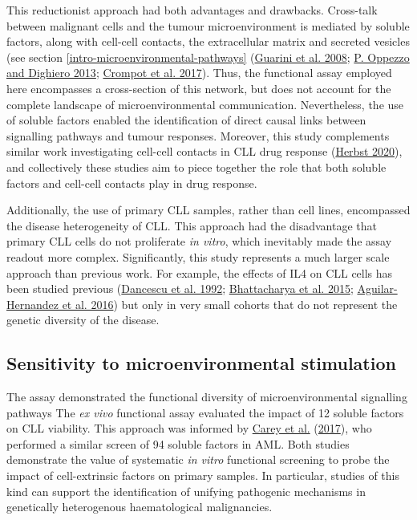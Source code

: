 \documentclass[11pt, a4paper, twosided]{book}
\begin{document}
This reductionist approach had both advantages and drawbacks. Cross-talk between malignant cells and the tumour microenvironment is mediated by soluble factors, along with cell-cell contacts, the extracellular matrix and secreted vesicles (see section \ref{intro-microenvironmental-pathways} (\protect\hyperlink{ref-Guarini2008}{Guarini et al. 2008}; \protect\hyperlink{ref-Oppezzo2013}{P. Oppezzo and Dighiero 2013}; \protect\hyperlink{ref-Crompot2017}{Crompot et al. 2017}). Thus, the functional assay employed here encompasses a cross-section of this network, but does not account for the complete landscape of microenvironmental communication. Nevertheless, the use of soluble factors enabled the identification of direct causal links between signalling pathways and tumour responses. Moreover, this study complements similar work investigating cell-cell contacts in CLL drug response (\protect\hyperlink{ref-HerbstThesis}{Herbst 2020}), and collectively these studies aim to piece together the role that both soluble factors and cell-cell contacts play in drug response.

Additionally, the use of primary CLL samples, rather than cell lines, encompassed the disease heterogeneity of CLL. This approach had the disadvantage that primary CLL cells do not proliferate \emph{in vitro}, which inevitably made the assay readout more complex. Significantly, this study represents a much larger scale approach than previous work. For example, the effects of IL4 on CLL cells has been studied previous (\protect\hyperlink{ref-Dancescu1992}{Dancescu et al. 1992}; \protect\hyperlink{ref-Bhattacharya2015}{Bhattacharya et al. 2015}; \protect\hyperlink{ref-AguilarHernandez2016}{Aguilar-Hernandez et al. 2016}) but only in very small cohorts that do not represent the genetic diversity of the disease.

\hypertarget{sensitivity-to-microenvironmental-stimulation}{%
\subsection{Sensitivity to microenvironmental stimulation}\label{sensitivity-to-microenvironmental-stimulation}}

The assay demonstrated the functional diversity of microenvironmental signalling pathways
The \emph{ex vivo} functional assay evaluated the impact of 12 soluble factors on CLL viability. This approach was informed by \protect\hyperlink{ref-Carey2017}{Carey et al.} (\protect\hyperlink{ref-Carey2017}{2017}), who performed a similar screen of 94 soluble factors in AML. Both studies demonstrate the value of systematic \emph{in vitro} functional screening to probe the impact of cell-extrinsic factors on primary samples. In particular, studies of this kind can support the identification of unifying pathogenic mechanisms in genetically heterogenous haematological malignancies.
\end{document}

